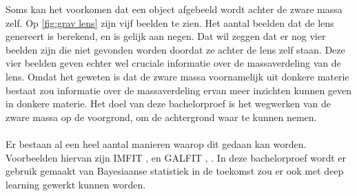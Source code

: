 Soms kan het voorkomen dat een object afgebeeld wordt achter de zware massa zelf. Op \cref{fig:grav lens} zijn vijf beelden te zien. Het aantal beelden dat de lens genereert is berekend, en is gelijk aan negen. Dat wil zeggen dat er nog vier beelden zijn die niet gevonden worden doordat ze achter de lens zelf staan. Deze vier beelden geven echter wel cruciale informatie over de massaverdeling van de lens. Omdat het geweten is dat de zware massa voornamelijk uit donkere materie bestaat zou informatie over de massaverdeling ervan meer inzichten kunnen geven in donkere materie. Het doel van deze bachelorproef is het wegwerken van de zware massa op de voorgrond, om de achtergrond waar te kunnen nemen. \\ \\
Er bestaan al een heel aantal manieren waarop dit gedaan kan worden. Voorbeelden hiervan zijn IMFIT \cite{chen-2020}, \cite{erwin-2015} en GALFIT \cite{peng-2010}, \cite{unknown-author-no-date-galfit}.
In deze bachelorproef wordt er gebruik gemaakt van Bayesiaanse statistiek in de toekomst zou er ook met deep learning gewerkt kunnen worden.




